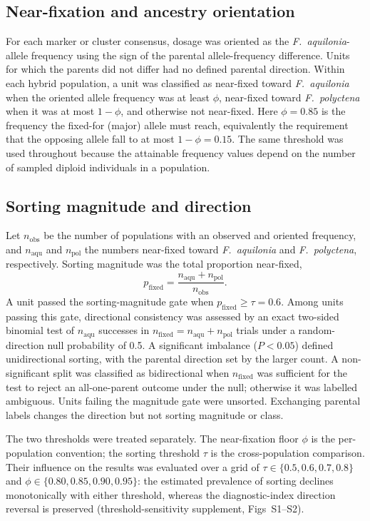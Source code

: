 \documentclass[11pt]{article}
\newcommand{\Faq}{\textit{F.~aquilonia}}
\newcommand{\Fpo}{\textit{F.~polyctena}}
\begin{document}
\subsection{Near-fixation and ancestry orientation}

For each marker or cluster consensus, dosage was oriented as the
\Faq-allele frequency using the sign of the parental allele-frequency
difference. Units for which the parents did not differ had no defined parental
direction. Within each hybrid population, a unit was classified as near-fixed
toward \Faq{} when the oriented allele frequency was at least \(\phi\),
near-fixed toward \Fpo{} when it was at most \(1-\phi\), and otherwise not
near-fixed. Here \(\phi=0.85\) is the frequency the fixed-for (major) allele must
reach, equivalently the requirement that the opposing allele fall to at most
\(1-\phi=0.15\). The same threshold was used throughout because the attainable
frequency values depend on the number of sampled diploid individuals in a
population.

\subsection{Sorting magnitude and direction}

Let \(n_{\mathrm{obs}}\) be the number of populations with an observed and
oriented frequency, and \(n_{\mathrm{aqu}}\) and \(n_{\mathrm{pol}}\) the
numbers near-fixed toward \Faq{} and \Fpo{}, respectively. Sorting magnitude was
the total proportion near-fixed,
\begin{equation}
 p_{\mathrm{fixed}}=
 \frac{n_{\mathrm{aqu}}+n_{\mathrm{pol}}}{n_{\mathrm{obs}}}.
\end{equation}
A unit passed the sorting-magnitude gate when
\(p_{\mathrm{fixed}}\geq\tau=0.6\). Among units passing this gate, directional
consistency was assessed by an exact two-sided binomial test of
\(n_{\mathrm{aqu}}\) successes in
\(n_{\mathrm{fixed}}=n_{\mathrm{aqu}}+n_{\mathrm{pol}}\) trials under a
random-direction null probability of 0.5. A significant imbalance
(\(P<0.05\)) defined unidirectional sorting, with the parental direction set by
the larger count. A non-significant split was classified as bidirectional when
\(n_{\mathrm{fixed}}\) was sufficient for the test to reject an all-one-parent
outcome under the null; otherwise it was labelled ambiguous. Units failing the
magnitude gate were unsorted. Exchanging parental labels changes the direction
but not sorting magnitude or class.

The two thresholds were treated separately. The near-fixation floor \(\phi\) is
the per-population convention; the sorting threshold
\(\tau\) is the cross-population comparison. Their influence on the results was
evaluated over a grid of \(\tau\in\{0.5,0.6,0.7,0.8\}\) and
\(\phi\in\{0.80,0.85,0.90,0.95\}\): the estimated prevalence of sorting declines
monotonically with either threshold, whereas the diagnostic-index direction
reversal is preserved (threshold-sensitivity supplement, Figs~S1--S2).
\end{document}
